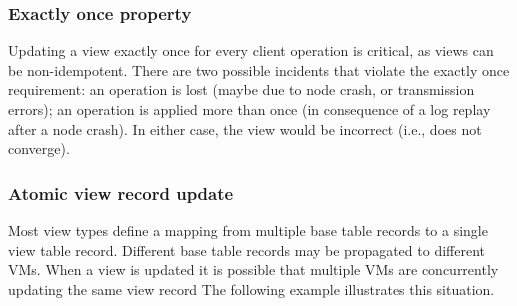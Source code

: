 \subsubsection{Exactly once property}
\label{subsubsec:exactly_once}  
Updating a view exactly once for every client operation is critical, 
as views can be non-idempotent. There are two possible incidents that 
violate the exactly once requirement: an operation is lost (maybe due to 
node crash, or transmission errors); an operation is applied 
more than once (in consequence of a log replay after a node crash). 
In either case, the view would be incorrect (i.e., does not converge).
 


%


\subsubsection{Atomic view record update}
\label{subsubsec:atomic_update} 

Most view types define a mapping from multiple base table records to 
a single view table record. Different base table records may be 
propagated to different VMs. When a view is updated it is possible that 
multiple VMs are concurrently updating the same view record The following 
example illustrates this situation.

